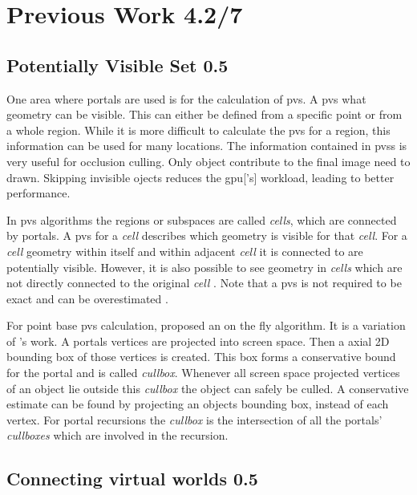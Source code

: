 \section{Previous Work 4.2/7}

\subsection{Potentially Visible Set 0.5}

One area where portals are used is for the calculation of \gls{pvs}. A \gls{pvs} what geometry can be visible. This can either be defined from a specific point or from a whole region. While it is more difficult to calculate the \gls{pvs} for a region, this information can be used for many locations. The information contained in \glspl{pvs} is very useful for occlusion culling. Only object contribute to the final image need to drawn. Skipping invisible ojects reduces the \gls{gpu}['s] workload, leading to better performance.

In \gls{pvs} algorithms the regions or subspaces are called \textit{cells}, which are connected by portals. A \gls{pvs} for a \textit{cell} describes which geometry is visible for that \textit{cell}. For a \textit{cell} geometry within itself and within adjacent \textit{cell} it is connected to are potentially visible. However, it is also possible to see geometry in \textit{cells} which are not directly connected to the original \textit{cell} . Note that a \gls{pvs} is not required to be exact and can be overestimated \cite{cohen:2003:survey}.

For point base \gls{pvs} calculation, \textcite{luebke:1995:portals} proposed an on the fly algorithm. It is  a variation of \textcite{jones:1971:new}'s work. A portals vertices are projected into screen space. Then a axial 2D bounding box of those vertices is created. This box forms a conservative bound for the portal and is called  \textit{cullbox}. Whenever all screen space projected vertices of an object lie outside this \textit{cullbox} the object can safely be culled. A conservative estimate can be found by projecting an objects bounding box, instead of each vertex. For portal recursions the \textit{cullbox} is the intersection of all the portals' \textit{cullboxes} which are involved in the recursion. 



\subsection{Connecting virtual worlds 0.5}

